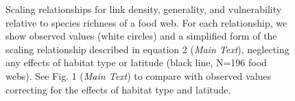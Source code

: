 \documentclass[12pt]{article}
\begin{document}
\begin{figure}[!h]
  \caption{Scaling relationships for link density, generality, 
  and vulnerability relative to species richness of a food web. 
  For each relationship, we show observed values (white circles) and 
  a simplified form of the scaling relationship described in equation 2 (\emph{Main Text}), neglecting 
  any effects of habitat type or latitude (black line, N=196 food webs). See Fig. 1 (\emph{Main Text}) to compare with 
  observed values correcting for the effects of habitat type and latitude. }
  \label{props_v_lat_obs}
  \end{figure}



\newpage


\end{document}
